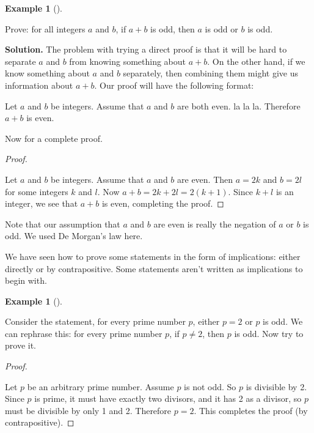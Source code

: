 \documentclass[10pt,]{book}
\theoremstyle{plain}
\theoremstyle{definition}
\newtheorem{example}[theorem]{Example}
\theoremstyle{definition}
\theoremstyle{definition}
\numberwithin{equation}{chapter}
\begin{document}
\begin{example}[]\label{example-92}

Prove: for all integers \(a\) and \(b\), if \(a + b\) is odd, then \(a\) is odd or \(b\) is odd.
%
\par\medskip\noindent%
\textbf{Solution.}\quad
The problem with trying a direct proof is that it will be hard to separate \(a\) and \(b\) from knowing something about \(a+b\). On the other hand, if we know something about \(a\) and \(b\) separately, then combining them might give us information about \(a+b\). Our proof will have the following format:
%
\par

Let \(a\) and \(b\) be integers. Assume that \(a\) and \(b\) are both even. la la la. Therefore \(a+b\) is even.
%
\par

Now for a complete proof.
%
\begin{proof}\hypertarget{proof-36}{}

Let \(a\) and \(b\) be integers. Assume that \(a\) and \(b\) are even. Then \(a = 2k\) and \(b = 2l\) for some integers \(k\) and \(l\). Now \(a + b = 2k + 2l = 2(k+1)\). Since \(k + l\) is an integer, we see that \(a + b\) is even, completing the proof.
%
\end{proof}
\par

Note that our assumption that \(a\) and \(b\) are even is really the negation of \(a\) or \(b\) is odd. We used De Morgan's law here.
%
\end{example}
\par

We have seen how to prove some statements in the form of implications: either directly or by contrapositive. Some statements aren't written as implications to begin with.
%
\begin{example}[]\label{example-93}

Consider the statement, for every prime number \(p\), either \(p = 2\) or \(p\) is odd. We can rephrase this: for every prime number \(p\), if \(p \ne 2\), then \(p\) is odd. Now try to prove it.
%
\begin{proof}\hypertarget{proof-37}{}

Let \(p\) be an arbitrary prime number. Assume \(p\) is not odd. So \(p\) is divisible by 2. Since \(p\) is prime, it must have exactly two divisors, and it has 2 as a divisor, so \(p\) must be divisible by only 1 and 2. Therefore \(p = 2\). This completes the proof (by contrapositive).
%
\end{proof}
\end{example}
\typeout{************************************************}
\typeout{************************************************}
\end{document}
